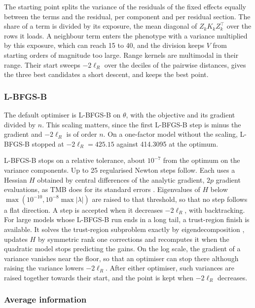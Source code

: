 \documentclass[article,nojss]{jss}
\renewcommand{\pkg}[1]{#1}
\begin{document}
The starting point splits the variance of the residuals of the fixed effects
equally between the terms and the residual, per component and per residual
section. The share of a term is divided by its exposure, the mean diagonal of
$Z_k K_k Z_k^\top$ over the rows it loads. A neighbour term enters the phenotype
with a variance multiplied by this exposure, which can reach 15 to 40, and the
division keeps $V$ from starting orders of magnitude too large. Range kernels
are multimodal in their range. Their start sweeps $-2\ell_R$ over the deciles of
the pairwise distances, gives the three best candidates a short descent, and
keeps the best point.

\subsubsection{L-BFGS-B}

The default optimiser is L-BFGS-B \citep{byrd1995} on $\theta$, with the
objective and its gradient divided by $n$. This scaling matters, since the
first L-BFGS-B step is minus the gradient and $-2\ell_R$ is of order $n$. On a
one-factor model without the scaling, L-BFGS-B stopped at $-2\ell_R = 425.15$
against 414.3095 at the optimum.

L-BFGS-B stops on a relative tolerance, about $10^{-7}$ from the optimum on
the variance components. Up to 25 regularised Newton steps follow. Each uses a
Hessian $H$ obtained by central differences of the analytic gradient, $2p$
gradient evaluations, as \pkg{TMB} does for its standard errors
\citep{kristensen2016}. Eigenvalues
of $H$ below $\max(10^{-10}, 10^{-8}\max|\lambda|)$ are raised to that
threshold, so that no step follows a flat direction. A step is accepted when it
decreases $-2\ell_R$, with backtracking. For large models whose L-BFGS-B run
ends in a long tail, a trust-region finish is available. It solves the
trust-region subproblem exactly by eigendecomposition \citep{more1983},
updates $H$ by symmetric rank one corrections and recomputes it when the
quadratic model stops predicting the gains. On the log scale, the gradient of
a variance vanishes near the floor, so that an optimiser can stop there
although raising the variance lowers $-2\ell_R$. After either optimiser, such
variances are raised together towards their start, and the point is kept when
$-2\ell_R$ decreases.

\subsubsection{Average information}
\end{document}
